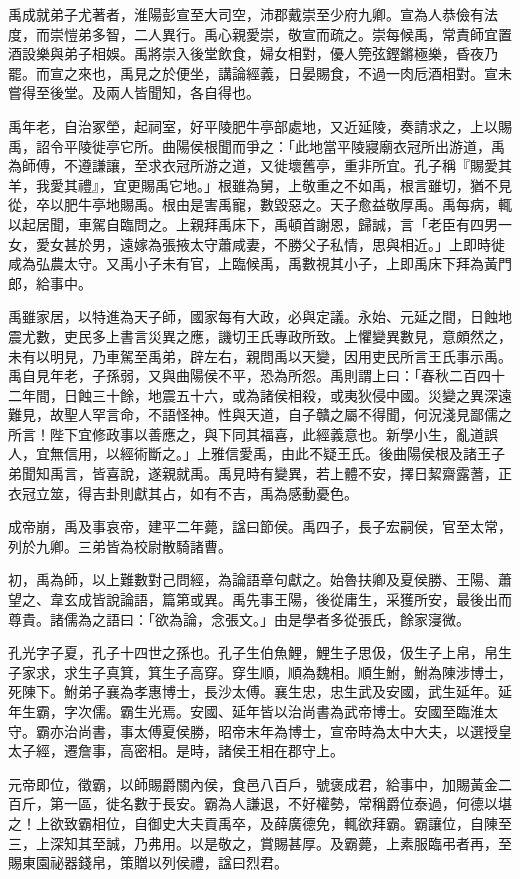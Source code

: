 \begin{pinyinscope}
禹成就弟子尤著者，淮陽彭宣至大司空，沛郡戴崇至少府九卿。宣為人恭儉有法度，而崇愷弟多智，二人異行。禹心親愛崇，敬宣而疏之。崇每候禹，常責師宜置酒設樂與弟子相娛。禹將崇入後堂飲食，婦女相對，優人筦弦鏗鏘極樂，昏夜乃罷。而宣之來也，禹見之於便坐，講論經義，日晏賜食，不過一肉卮酒相對。宣未嘗得至後堂。及兩人皆聞知，各自得也。

禹年老，自治冢塋，起祠室，好平陵肥牛亭部處地，又近延陵，奏請求之，上以賜禹，詔令平陵徙亭它所。曲陽侯根聞而爭之：「此地當平陵寢廟衣冠所出游道，禹為師傅，不遵謙讓，至求衣冠所游之道，又徙壞舊亭，重非所宜。孔子稱『賜愛其羊，我愛其禮』，宜更賜禹它地。」根雖為舅，上敬重之不如禹，根言雖切，猶不見從，卒以肥牛亭地賜禹。根由是害禹寵，數毀惡之。天子愈益敬厚禹。禹每病，輒以起居聞，車駕自臨問之。上親拜禹床下，禹頓首謝恩，歸誠，言「老臣有四男一女，愛女甚於男，遠嫁為張掖太守蕭咸妻，不勝父子私情，思與相近。」上即時徙咸為弘農太守。又禹小子未有官，上臨候禹，禹數視其小子，上即禹床下拜為黃門郎，給事中。

禹雖家居，以特進為天子師，國家每有大政，必與定議。永始、元延之間，日蝕地震尤數，吏民多上書言災異之應，譏切王氏專政所致。上懼變異數見，意頗然之，未有以明見，乃車駕至禹弟，辟左右，親問禹以天變，因用吏民所言王氏事示禹。禹自見年老，子孫弱，又與曲陽侯不平，恐為所怨。禹則謂上曰：「春秋二百四十二年間，日蝕三十餘，地震五十六，或為諸侯相殺，或夷狄侵中國。災變之異深遠難見，故聖人罕言命，不語怪神。性與天道，自子贛之屬不得聞，何況淺見鄙儒之所言！陛下宜修政事以善應之，與下同其福喜，此經義意也。新學小生，亂道誤人，宜無信用，以經術斷之。」上雅信愛禹，由此不疑王氏。後曲陽侯根及諸王子弟聞知禹言，皆喜說，遂親就禹。禹見時有變異，若上體不安，擇日絜齋露蓍，正衣冠立筮，得吉卦則獻其占，如有不吉，禹為感動憂色。

成帝崩，禹及事哀帝，建平二年薨，諡曰節侯。禹四子，長子宏嗣侯，官至太常，列於九卿。三弟皆為校尉散騎諸曹。

初，禹為師，以上難數對己問經，為論語章句獻之。始魯扶卿及夏侯勝、王陽、蕭望之、韋玄成皆說論語，篇第或異。禹先事王陽，後從庸生，采獲所安，最後出而尊貴。諸儒為之語曰：「欲為論，念張文。」由是學者多從張氏，餘家寖微。

孔光字子夏，孔子十四世之孫也。孔子生伯魚鯉，鯉生子思伋，伋生子上帛，帛生子家求，求生子真箕，箕生子高穿。穿生順，順為魏相。順生鮒，鮒為陳涉博士，死陳下。鮒弟子襄為孝惠博士，長沙太傅。襄生忠，忠生武及安國，武生延年。延年生霸，字次儒。霸生光焉。安國、延年皆以治尚書為武帝博士。安國至臨淮太守。霸亦治尚書，事太傅夏侯勝，昭帝末年為博士，宣帝時為太中大夫，以選授皇太子經，遷詹事，高密相。是時，諸侯王相在郡守上。

元帝即位，徵霸，以師賜爵關內侯，食邑八百戶，號褒成君，給事中，加賜黃金二百斤，第一區，徙名數于長安。霸為人謙退，不好權勢，常稱爵位泰過，何德以堪之！上欲致霸相位，自御史大夫貢禹卒，及薛廣德免，輒欲拜霸。霸讓位，自陳至三，上深知其至誠，乃弗用。以是敬之，賞賜甚厚。及霸薨，上素服臨弔者再，至賜東園祕器錢帛，策贈以列侯禮，諡曰烈君。


\end{pinyinscope}
